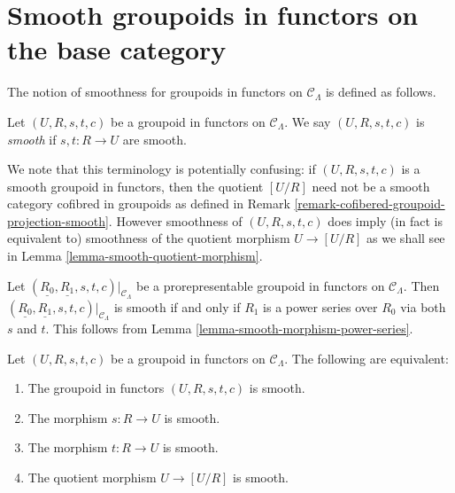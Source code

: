 \section{Smooth groupoids in functors on the base category}
\label{section-smooth-minimal-groupoids-in-functors}

\noindent
The notion of smoothness for groupoids in functors on $\mathcal{C}_\Lambda$ is
defined as follows.

\begin{definition}
\label{definition-smooth-groupoid-in-functors}
Let $(U, R, s, t, c)$ be a groupoid in functors on $\mathcal{C}_\Lambda$. We
say $(U, R, s, t, c)$ is {\it smooth} if $s, t: R \to U$ are smooth.
\end{definition}

\begin{remark}
\label{remark-smooth-groupoid-in-functors-warning}
We note that this terminology is potentially confusing:
if $(U, R, s, t, c)$ is a smooth groupoid in functors, then the quotient
$[U/R]$ need not be a smooth category cofibred in groupoids as defined in
Remark \ref{remark-cofibered-groupoid-projection-smooth}.
However smoothness of $(U, R, s, t, c)$ does imply (in fact is equivalent to)
smoothness of the quotient morphism $U \to [U/R]$ as we shall
see in
Lemma \ref{lemma-smooth-quotient-morphism}.
\end{remark}

\begin{remark}
\label{remark-smooth-power-series-prorepresentable-smooth-groupoid-in-functors}
Let $(\underline{R_0}, \underline{R_1}, s, t, c)|_{\mathcal{C}_\Lambda}$
be a prorepresentable groupoid in functors on $\mathcal{C}_\Lambda$.
Then $(\underline{R_0}, \underline{R_1}, s, t, c)|_{\mathcal{C}_\Lambda}$
is smooth if and only if $R_1$ is a power series over $R_0$ via both $s$
and $t$. This follows from
Lemma \ref{lemma-smooth-morphism-power-series}.
\end{remark}

\begin{lemma}
\label{lemma-smooth-quotient-morphism}
Let $(U, R, s, t, c)$ be a groupoid in functors on $\mathcal{C}_\Lambda$.
The following are equivalent:
\begin{enumerate}
\item The groupoid in functors $(U, R, s, t, c)$ is smooth.
\item The morphism $s : R \to U$ is smooth.
\item The morphism $t : R \to U$ is smooth.
\item The quotient morphism $U \to [U/R]$ is smooth.
\end{enumerate}
\end{lemma}

